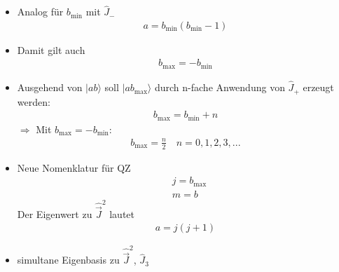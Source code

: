 \documentclass[10pt,article,colorback,accentcolor=tud9d]{scrartcl}
\begin{document}
\begin{itemize}
  \item Analog für $b_\text{min}$ mit $\hat{J}_-$
    \begin{align}
    a=b_\text{min}(b_\text{min}-1)
    \end{align}
  \item Damit gilt auch 
    \begin{align}
    b_\text{max}=-b_\text{min}
    \end{align}
  \item Ausgehend von $|ab\rangle$ soll $|ab_\text{max}\rangle$ durch n-fache Anwendung von $\hat{J}_+$ erzeugt werden:
    \begin{align}
    b_\text{max}=b_\text{min}+n
    \end{align}
    $\Rightarrow$ Mit $b_\text{max}=-b_\text{min}$:
    \begin{align}
    b_\text{max}=\frac{n}{2} \quad n=0,1,2,3,...
    \end{align}
 \item Neue Nomenklatur für QZ
   \begin{align}
   &j=b_\text{max}\\
   &m=b
   \end{align}
   Der Eigenwert zu $\hat{\vec{J}}^2$ lautet
   \begin{align}
    a=j(j+1)
   \end{align}
  \item simultane Eigenbasis zu $\hat{\vec{J}}^2$, $\hat{J}_3$
 

\end{itemize}
\end{document}
